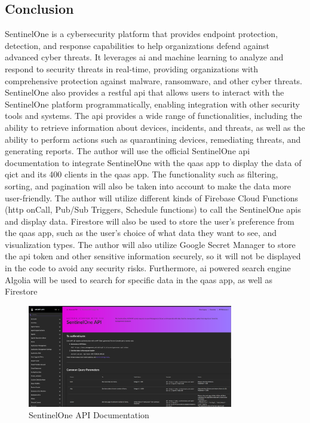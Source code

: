 \begin{multicols}{2}
      \subsection{Conclusion}
      SentinelOne is a cybersecurity platform that provides endpoint protection, detection, and response capabilities
      to help organizations defend against advanced cyber threats. It leverages \acrshort{ai} and machine learning to
      analyze and respond to security threats in real-time, providing organizations with comprehensive protection against
      malware, ransomware, and other cyber threats. %
      SentinelOne also provides a \acrshort{rest}ful \acrshort{api} that allows users to interact with the SentinelOne platform
      programmatically, enabling integration with other security tools and systems. The \acrshort{api} provides a wide range of
      functionalities, including the ability to retrieve information about devices, incidents, and threats, as well as the ability
      to perform actions such as quarantining devices, remediating threats, and generating reports. The author will use the official
      SentinelOne \acrshort{api} documentation to integrate SentinelOne with the \acrshort{qaas} app to display the data of
      \acrshort{qict} and its 400 clients in the \acrshort{qaas} app. The functionality such as filtering, sorting, and pagination
      will also be taken into account to make the data more user-friendly. The author will utilize different kinds of Firebase Cloud
      Functions (\acrshort{http} onCall, Pub/Sub Triggers, Schedule functions) to call the SentinelOne \acrshort{api}s and display
      data. Firestore will also be used to store the user's preference from the \acrshort{qaas} app, such as the user's choice of
      what data they want to see, and visualization types. The author will also utilize Google Secret Manager to store the
      \acrshort{api} token and other sensitive information securely, so it will not be displayed in the code to avoid any security
      risks. Furthermore, \acrshort{ai} powered search engine Algolia will be used to search for specific data in the \acrshort{qaas} app,
      as well as Firestore

\end{multicols}

\begin{figure}[htbp]
      \centering
      \includegraphics[width=0.8\textwidth]{Figures/SentinelOne/API Doc.png}
      \caption{SentinelOne API Documentation}
\end{figure}

